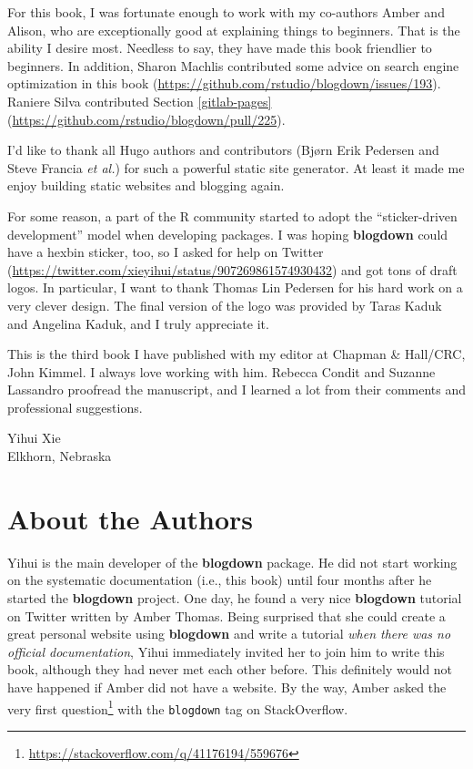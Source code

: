 \documentclass[12pt,]{krantz}
\renewcommand{\href}[2]{#2\footnote{\url{#1}}}
\theoremstyle{definition}
\theoremstyle{definition}
\theoremstyle{definition}
\theoremstyle{remark}
\let\BeginKnitrBlock\begin \let\EndKnitrBlock\end
\begin{document}
For this book, I was fortunate enough to work with my co-authors Amber
and Alison, who are exceptionally good at explaining things to
beginners. That is the ability I desire most. Needless to say, they have
made this book friendlier to beginners. In addition, Sharon Machlis
contributed some advice on search engine optimization in this book
(\url{https://github.com/rstudio/blogdown/issues/193}). Raniere Silva
contributed Section \ref{gitlab-pages}
(\url{https://github.com/rstudio/blogdown/pull/225}).

I'd like to thank all Hugo authors and contributors (Bjørn Erik Pedersen
and Steve Francia \emph{et al.}) for such a powerful static site
generator. At least it made me enjoy building static websites and
blogging again.

For some reason, a part of the R community started to adopt the
``sticker-driven development'' model when developing packages. I was
hoping \textbf{blogdown} could have a hexbin sticker, too, so I asked
for help on Twitter
(\url{https://twitter.com/xieyihui/status/907269861574930432}) and got
tons of draft logos. In particular, I want to thank Thomas Lin Pedersen
for his hard work on a very clever design. The final version of the logo
was provided by Taras Kaduk and Angelina Kaduk, and I truly appreciate
it.

This is the third book I have published with my editor at Chapman \&
Hall/CRC, John Kimmel. I always love working with him. Rebecca Condit
and Suzanne Lassandro proofread the manuscript, and I learned a lot from
their comments and professional suggestions.

\BeginKnitrBlock{flushright}
Yihui Xie\\
Elkhorn, Nebraska
\EndKnitrBlock{flushright}

\hypertarget{author}{%
\chapter*{About the Authors}\label{author}}


Yihui is the main developer of the \textbf{blogdown} package. He did not
start working on the systematic documentation (i.e., this book) until
four months after he started the \textbf{blogdown} project. One day, he
found a very nice \textbf{blogdown} tutorial on Twitter written by Amber
Thomas. Being surprised that she could create a great personal website
using \textbf{blogdown} and write a tutorial \emph{when there was no
official documentation}, Yihui immediately invited her to join him to
write this book, although they had never met each other before. This
definitely would not have happened if Amber did not have a website. By
the way, Amber asked
\href{https://stackoverflow.com/q/41176194/559676}{the very first
question} with the \texttt{blogdown} tag on StackOverflow.
\end{document}
